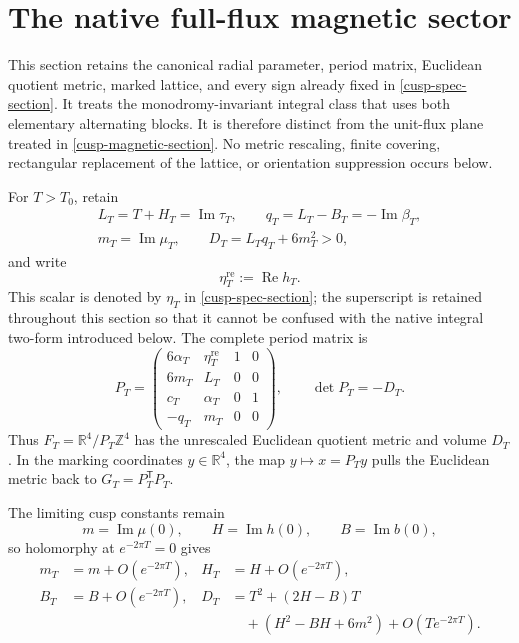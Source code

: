 \section{The native full-flux magnetic sector}
\label{cusp-native-full-flux-section}

This section retains the canonical radial parameter, period matrix, Euclidean
quotient metric, marked lattice, and every sign already fixed in
\cref{cusp-spec-section}.  It treats the monodromy-invariant integral class
that uses both elementary alternating blocks.  It is therefore distinct from
the unit-flux plane treated in \cref{cusp-magnetic-section}.  No metric
rescaling, finite covering, rectangular replacement of the lattice, or
orientation suppression occurs below.

For \(T>T_0\), retain
\begin{equation}
 \begin{gathered}
 L_T=T+H_T=\operatorname{Im}\tau_T,
 \qquad q_T=L_T-B_T=-\operatorname{Im}\beta_T,\\
 m_T=\operatorname{Im}\mu_T,
 \qquad D_T=L_Tq_T+6m_T^2>0,
 \end{gathered}
 \label{cusp-native-full-flux-canonical-scalars}
\end{equation}
and
write
\[
 \eta_T^{\mathrm{re}}:=\operatorname{Re}h_T.
\]
This scalar is denoted by \(\eta_T\) in
\cref{cusp-spec-section}; the superscript is retained throughout this
section so that it cannot be confused with the native integral two-form
introduced below.  The complete period matrix is
\begin{equation}
 P_T=
 \begin{pmatrix}
  6\alpha_T&\eta_T^{\mathrm{re}}&1&0\\
  6m_T&L_T&0&0\\
  c_T&\alpha_T&0&1\\
  -q_T&m_T&0&0
 \end{pmatrix},
 \qquad \det P_T=-D_T.
 \label{cusp-native-full-flux-period-matrix}
\end{equation}
Thus \(F_T=\mathbb R^4/P_T\mathbb Z^4\) has the unrescaled Euclidean quotient
metric and volume \(D_T\).  In the marking coordinates \(y\in\mathbb R^4\),
the map \(y\mapsto x=P_Ty\) pulls the Euclidean metric back to
\(G_T=P_T^{\mathsf T}P_T\).

The limiting cusp constants remain
\begin{equation}
 m=\operatorname{Im}\mu(0),\qquad
 H=\operatorname{Im}h(0),\qquad
 B=\operatorname{Im}b(0),
 \label{cusp-native-full-flux-limiting-constants}
\end{equation}
so holomorphy at \(e^{-2\pi T}=0\) gives
\begin{equation}
 \begin{aligned}
 m_T&=m+O(e^{-2\pi T}),&
 H_T&=H+O(e^{-2\pi T}),\\
 B_T&=B+O(e^{-2\pi T}),&
 D_T&=T^2+(2H-B)T\\
 &&&\quad +(H^2-BH+6m^2)+O(Te^{-2\pi T}).
 \end{aligned}
 \label{cusp-native-full-flux-cusp-expansions}
\end{equation}

